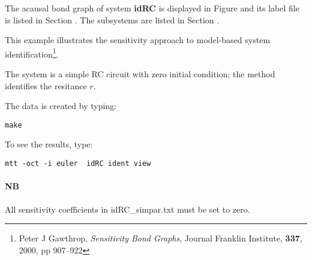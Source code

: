 

   The acausal bond graph of system \textbf{idRC} is
   displayed in Figure  and its label
   file is listed in Section .
   The subsystems are listed in Section .

   
   This example illustrates the sensitivity approach to model-based
   system identification\footnote{Peter J Gawthrop, \emph{Sensitivity
       Bond Graphs}, Journal Franklin Institute, \textbf{337}, 2000,
     pp 907--922}.

   The system is a simple RC circuit with zero initial condition; the
   method identifies the resitance $r$.

   The data is created by typing:
\begin{verbatim}
make
\end{verbatim}
To see the results, type: 
\begin{verbatim}
mtt -oct -i euler  idRC ident view
\end{verbatim}

   \paragraph{NB} All sensitivity coefficients in idRC\_simpar.txt must
   be set to zero.